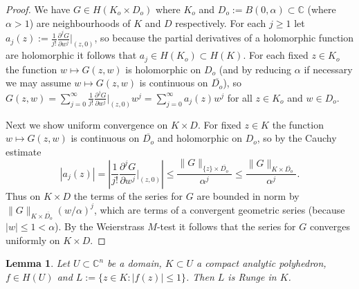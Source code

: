 \documentclass[11pt,a4paper, final, twoside]{article}
\newtheorem{lemma}[theorem]{Lemma}
\numberwithin{equation}{section}
\newcommand{\C}{\mathbb C}
\newcommand{\clos}[1]{\overline{#1}}
\newcommand{\ball}{B}
\newcommand{\hol}{H}
\begin{document}
\begin{proof}
We have $G\in\hol(K_o\times D_o)$ where $K_o$ and $D_o:=\ball(0,\alpha)\subset\C$ (where $\alpha>1$) are neighbourhoods of $K$ and $D$ respectively.
For each $j\geq 1$ let $a_j(z):=\frac{1}{j!}\frac{\partial^j G}{\partial w^j}\big|_{(z,0)}$, so because the partial derivatives of a holomorphic function
are holomorphic it follows that $a_j\in\hol(K_o)\subset \hol(K)$. For each
fixed $z\in K_o$ the function $w\mapsto G(z,w)$ is holomorphic on $D_o$ (and by reducing $\alpha$ if necessary we may assume $w\mapsto G(z,w)$ is continuous
on $\clos{D_o}$), so $G(z,w)=\sum_{j=0}^\infty \frac{1}{j!}\frac{\partial^j G}{\partial w^j}\big|_{(z,0)}w^j=\sum_{j=0}^\infty a_j(z)w^j$ for all $z\in K_o$ and $w\in D_o$.

Next we show uniform convergence on $K\times D$. For fixed $z\in K$ the function $w\mapsto G(z,w)$ is continuous on $\clos{D_o}$ and
holomorphic on $D_o$, so by the Cauchy estimate 
$$|a_j(z)|= \left|\frac{1}{j!}\frac{\partial^j G}{\partial w^j}\bigg|_{(z,0)}\right|\leq \frac{\|G\|_{\{z\}\times \clos{D_o}}}{\alpha^j} \leq \frac{\|G\|_{K\times\clos{D_o}}}{\alpha^j}.$$
Thus on $K\times D$ the terms of the series for $G$ are bounded in norm by $\|G\|_{K\times\clos{D_o}}(w/\alpha)^j$, which are terms of a convergent geometric series (because $|w|\leq 1<\alpha$).
By the Weierstrass $M$-test it follows that the series for $G$ converges uniformly on $K\times D$.
\end{proof}
\begin{lemma}
\label{capolrunge1}
Let $U\subset\C^n$ be a domain, $K\subset U$ a compact analytic polyhedron, $f\in\hol(U)$ and $L:=\{z\in K\colon |f(z)|\leq 1\}$. Then $L$ is Runge in $K$.
\end{lemma}
\end{document}
